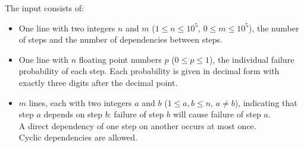 
    The input consists of:
    \begin{itemize}
        \item One line with two integers $n$ and $m$ ($1 \leq n \leq 10^5$, $0 \leq m \leq 10^5$),
            the number of steps and the number of dependencies between steps.
        \item One line with $n$ floating point numbers $p$ ($0 \leq p \leq 1$),
            the individual failure probability of each step.
            Each probability is given in decimal form\footnotemark[1]{} with exactly three digits after the decimal point.
        \item $m$ lines, each with two integers $a$ and $b$ ($1 \leq a, b \leq n$, $a \neq b$),
            indicating that step $a$ depends on step $b$:
            failure of step $b$ will cause failure of step $a$. \\
            A direct dependency of one step on another occurs at most once. \\
            Cyclic dependencies are allowed.
    \end{itemize}
